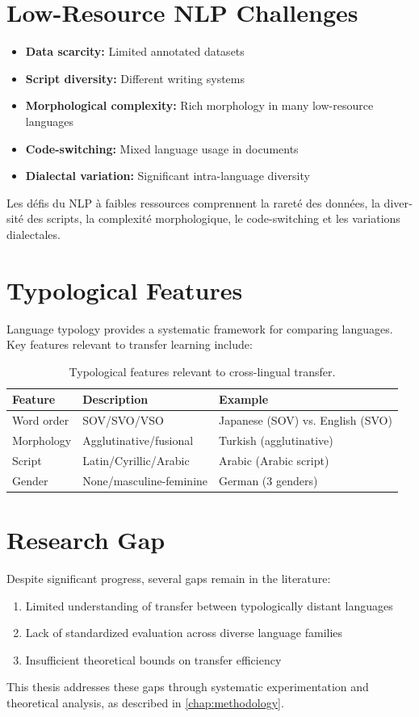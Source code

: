 \section{Low-Resource NLP Challenges}

\begin{itemize}
    \item \textbf{Data scarcity:} Limited annotated datasets
    \item \textbf{Script diversity:} Different writing systems
    \item \textbf{Morphological complexity:} Rich morphology in many
          low-resource languages
    \item \textbf{Code-switching:} Mixed language usage in documents
    \item \textbf{Dialectal variation:} Significant intra-language diversity
\end{itemize}

\foreignlanguage{french}{Les défis du NLP à faibles ressources
comprennent la rareté des données, la diversité des scripts, la
complexité morphologique, le code-switching et les variations
dialectales.}

\section{Typological Features}
Language typology provides a systematic framework for comparing
languages.  Key features relevant to transfer learning include:

\begin{table}[htbp]
    \centering
    \caption{Typological features relevant to cross-lingual transfer.}
    \label{tab:typology}
    \begin{tabular}{@{}lll@{}}
        \toprule
        Feature & Description & Example \\
        \midrule
        Word order & SOV/SVO/VSO & Japanese (SOV) vs. English (SVO) \\
        Morphology & Agglutinative/fusional & Turkish (agglutinative) \\
        Script & Latin/Cyrillic/Arabic & Arabic (Arabic script) \\
        Gender & None/masculine-feminine & German (3 genders) \\
        \bottomrule
    \end{tabular}
\end{table}

\section{Research Gap}
Despite significant progress, several gaps remain in the literature:
\begin{enumerate}
    \item Limited understanding of transfer between typologically
          distant languages
    \item Lack of standardized evaluation across diverse language families
    \item Insufficient theoretical bounds on transfer efficiency
\end{enumerate}

This thesis addresses these gaps through systematic experimentation
and theoretical analysis, as described in \cref{chap:methodology}.
